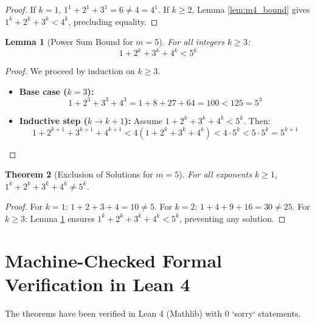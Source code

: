 \documentclass[11pt,a4paper]{article}
\newtheorem{theorem}{Theorem}[section]
\newtheorem{lemma}[theorem]{Lemma}
\theoremstyle{definition}
\begin{document}
\begin{proof}
If $k = 1$, $1^1 + 2^1 + 3^1 = 6 \ne 4 = 4^1$.
If $k \ge 2$, Lemma \ref{lem:m4_bound} gives $1^k + 2^k + 3^k < 4^k$, precluding equality.
\end{proof}

\begin{lemma}[Power Sum Bound for $m=5$]\label{lem:m5_bound}
For all integers $k \ge 3$:
\begin{equation}\label{eq:m5_bound}
1 + 2^k + 3^k + 4^k < 5^k
\end{equation}
\end{lemma}

\begin{proof}
We proceed by induction on $k \ge 3$.
\begin{itemize}
    \item \textbf{Base case ($k = 3$):}
    \[ 1 + 2^3 + 3^3 + 4^3 = 1 + 8 + 27 + 64 = 100 < 125 = 5^3 \]
    \item \textbf{Inductive step ($k \to k+1$):} Assume $1 + 2^k + 3^k + 4^k < 5^k$. Then:
    \[ 1 + 2^{k+1} + 3^{k+1} + 4^{k+1} < 4 (1 + 2^k + 3^k + 4^k) < 4 \cdot 5^k < 5 \cdot 5^k = 5^{k+1} \]
\end{itemize}
\end{proof}

\begin{theorem}[Exclusion of Solutions for $m=5$]\label{thm:m5}
For all exponents $k \ge 1$, $1^k + 2^k + 3^k + 4^k \ne 5^k$.
\end{theorem}

\begin{proof}
For $k = 1$: $1 + 2 + 3 + 4 = 10 \ne 5$.
For $k = 2$: $1 + 4 + 9 + 16 = 30 \ne 25$.
For $k \ge 3$: Lemma \ref{lem:m5_bound} ensures $1^k + 2^k + 3^k + 4^k < 5^k$, preventing any solution.
\end{proof}

\section{Machine-Checked Formal Verification in Lean 4}

The theorems have been verified in Lean 4 (Mathlib) with $0$ `sorry` statements.
\end{document}
